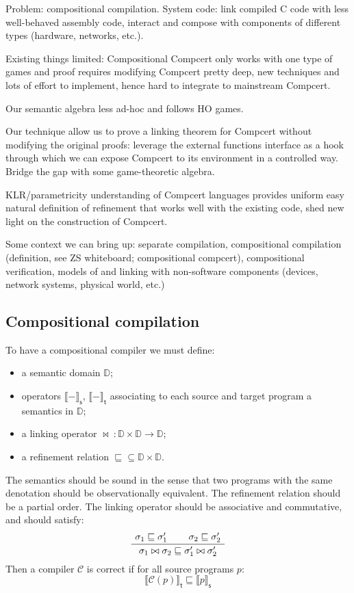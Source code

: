 \documentclass[acmsmall,anonymous]{acmart}
\newcommand{\kw}[1]{\ensuremath{ \textsf{#1} }}
\begin{document}
Problem:
compositional compilation.
System code:
link compiled C code with less well-behaved assembly code,
interact and compose with components of different types
(hardware, networks, etc.).

Existing things limited:
Compositional Compcert only works with one type of games
and proof requires modifying Compcert pretty deep,
new techniques and lots of effort to implement,
hence hard to integrate to mainstream Compcert.

Our semantic algebra less ad-hoc and follows HO games.

Our technique allow us to prove a linking theorem for Compcert
without modifying the original proofs:
leverage the external functions interface as a hook
through which we can expose Compcert to its environment in a controlled way.
Bridge the gap with some game-theoretic algebra.

KLR/parametricity understanding of Compcert languages provides
uniform easy natural definition of refinement
that works well with the existing code,
shed new light on the construction of Compcert.

Some context we can bring up:
separate compilation,
compositional compilation (definition, see ZS whiteboard; compositional compcert),
compositional verification,
models of and linking with non-software components
(devices, network systems, physical world, etc.)

\subsection{Compositional compilation}

To have a compositional compiler we must define:
\begin{itemize}
\item a semantic domain $\mathbb{D}$;
\item operators $\llbracket - \rrbracket_\kw{s}$, $\llbracket - \rrbracket_\kw{t}$
  associating to each source and target program a semantics in $\mathbb{D}$;
\item a linking operator $\bowtie \: : \mathbb{D} \times \mathbb{D} \rightarrow \mathbb{D}$;
\item a refinement relation ${\sqsubseteq} \subseteq \mathbb{D} \times \mathbb{D}$.
\end{itemize}
The semantics should be sound in the sense that
two programs with the same denotation should be observationally equivalent.
The refinement relation should be a partial order.
The linking operator should be associative and commutative,
and should satisfy:
\[
  \AxiomC{$\sigma_1 \sqsubseteq \sigma_1'$}
  \AxiomC{$\sigma_2 \sqsubseteq \sigma_2'$}
  \BinaryInfC{$\sigma_1 \bowtie \sigma_2 \sqsubseteq \sigma_1' \bowtie \sigma_2'$}
  \DisplayProof
\]
Then a compiler $\mathcal{C}$ is correct if
for all source programs $p$:
\[
  \llbracket \mathcal{C}(p) \rrbracket_\kw{t} \sqsubseteq
  \llbracket p \rrbracket_\kw{s}
\]
\end{document}
